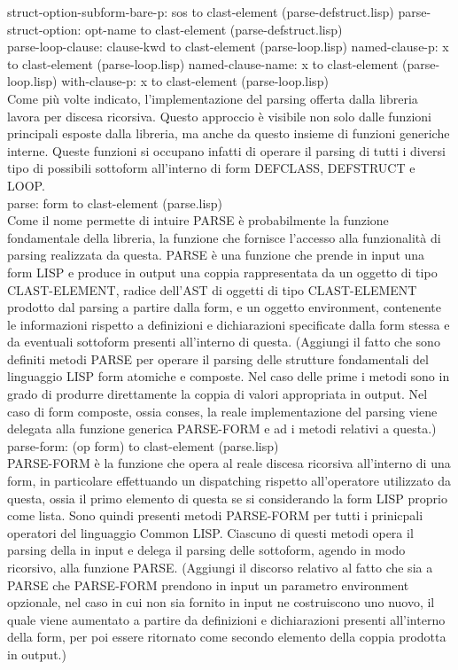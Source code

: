 struct-option-subform-bare-p: sos to clast-element (parse-defstruct.lisp)
parse-struct-option: opt-name to clast-element (parse-defstruct.lisp)\\

parse-loop-clause: clause-kwd to clast-element (parse-loop.lisp)
named-clause-p: x to clast-element (parse-loop.lisp)
named-clause-name: x to clast-element (parse-loop.lisp)
with-clause-p: x to clast-element (parse-loop.lisp)\\

Come più volte indicato, l'implementazione del parsing offerta dalla libreria lavora per discesa ricorsiva. Questo approccio è visibile non solo dalle funzioni principali esposte dalla libreria, ma anche da questo insieme di funzioni generiche interne. Queste funzioni si occupano infatti di operare il parsing di tutti i diversi tipo di possibili sottoform all'interno di form DEFCLASS, DEFSTRUCT e LOOP.\\

parse: form to clast-element (parse.lisp)\\

Come il nome permette di intuire PARSE è probabilmente la funzione fondamentale della libreria, la funzione che fornisce l'accesso alla funzionalità di parsing realizzata da questa. PARSE è una funzione che prende in input una form LISP e produce in output una coppia rappresentata da un oggetto di tipo CLAST-ELEMENT, radice dell'AST di oggetti di tipo CLAST-ELEMENT prodotto dal parsing a partire dalla form, e un oggetto environment, contenente le informazioni rispetto a definizioni e dichiarazioni specificate dalla form stessa e da eventuali sottoform presenti all'interno di questa. (Aggiungi il fatto che sono definiti metodi PARSE per operare il parsing delle strutture fondamentali del linguaggio LISP form atomiche e composte. Nel caso delle prime i metodi sono in grado di produrre direttamente la coppia di valori appropriata in output. Nel caso di form composte, ossia conses, la reale implementazione del parsing viene delegata alla funzione generica PARSE-FORM e ad i metodi relativi a questa.)\\

parse-form: (op form) to clast-element (parse.lisp)\\

PARSE-FORM è la funzione che opera al reale discesa ricorsiva all'interno di una form, in particolare effettuando un dispatching rispetto all'operatore utilizzato da questa, ossia il primo elemento di questa se si considerando la form LISP proprio come lista. Sono quindi presenti metodi PARSE-FORM per tutti i prinicpali operatori del linguaggio Common LISP. Ciascuno di questi metodi opera il parsing della in input e delega il parsing delle sottoform, agendo in modo ricorsivo, alla funzione PARSE. (Aggiungi il discorso relativo al fatto che sia a PARSE che PARSE-FORM prendono in input un parametro environment opzionale, nel caso in cui non sia fornito in input ne costruiscono uno nuovo, il quale viene aumentato a partire da definizioni e dichiarazioni presenti all'interno della form, per poi essere ritornato come secondo elemento della coppia prodotta in output.)\\


